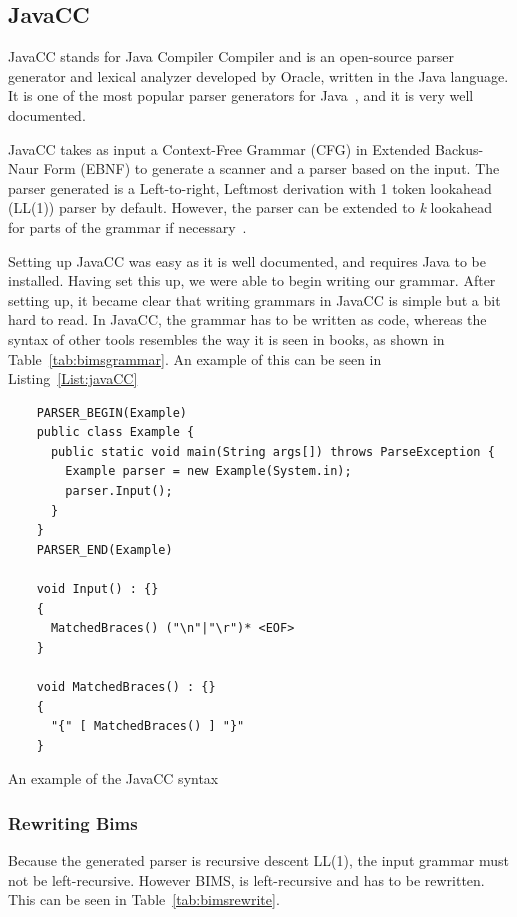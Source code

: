 \subsection{JavaCC}
JavaCC stands for Java Compiler Compiler and is an open-source parser generator and lexical analyzer developed by Oracle, written in the Java language. It is one of the most popular parser generators for Java~\cite{JavaCC2021}, and it is very well documented.

JavaCC takes as input a Context-Free Grammar (CFG) in Extended Backus-Naur Form (EBNF) to generate a scanner and a parser based on the input. The parser generated is a Left-to-right, Leftmost derivation with 1 token lookahead (LL(1)) parser by default. However, the parser can be extended to \textit{k} lookahead for parts of the grammar if necessary~\cite{JavaCC2021}.

Setting up JavaCC was easy as it is well documented, and requires Java to be installed. Having set this up, we were able to begin writing our grammar. After setting up, it became clear that writing grammars in JavaCC is simple but a bit hard to read. In JavaCC, the grammar has to be written as code, whereas the syntax of other tools resembles the way it is seen in books, as shown in Table~\ref{tab:bimsgrammar}. An example of this can be seen in Listing~\ref{List:javaCC}

\begin{listing}[htb!]
  \centering
  \begin{verbatim}
    PARSER_BEGIN(Example)
    public class Example {
      public static void main(String args[]) throws ParseException {
        Example parser = new Example(System.in);
        parser.Input();
      }
    }
    PARSER_END(Example)

    void Input() : {}
    {
      MatchedBraces() ("\n"|"\r")* <EOF>
    }

    void MatchedBraces() : {}
    {
      "{" [ MatchedBraces() ] "}"
    }
\end{verbatim}
  \caption{An example of the JavaCC syntax}
  \label{List:javaCC}
\end{listing}

\subsubsection{Rewriting Bims}
Because the generated parser is recursive descent LL(1), the input grammar must not be left-recursive. However BIMS, is left-recursive and has to be rewritten. This can be seen in Table~\ref{tab:bimsrewrite}.

